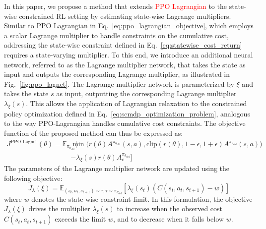 In this paper, we propose a method that extends \textcolor{red}{PPO Lagrangian} to the state-wise constrained RL setting by estimating state-wise Lagrange multipliers.
Similar to PPO Lagrangian in Eq.~\ref{eq:ppo_lagrangian_objective}, which employs a scalar Lagrange multiplier to handle constraints on the cumulative cost, addressing the state-wise constraint defined in Eq.~\ref{eq:statewise_cost_return} requires a state-varying multiplier.
To this end, we introduce an additional neural network, referred to as the Lagrange multiplier network, that takes the state as input and outputs the corresponding Lagrange multiplier, as illustrated in Fig.~\ref{fig:ppo_lagnet}.
The Lagrange multiplier network is parameterized by $\xi$ and takes the state $s$ as input, outputting the corresponding Lagrange multiplier $\lambda_\xi(s)$.
This allows the application of Lagrangian relaxation to the constrained policy optimization defined in Eq.~\ref{eq:scmdp_optimization_problem}, analogous to the way PPO-Lagrangian handles cumulative cost constraints.
The objective function of the proposed method can thus be expressed as:
\begin{equation} 
    \begin{aligned} J^{\text{PPO-Lagnet}}(\theta) 
        = \mathbb{E}_{\pi_{\theta_\text{old}}} \Big[ &\min \big( r(\theta) A^{\pi_{\theta_\text{old}}}(s, a), \text{clip}(r(\theta), 1 - \epsilon, 1 + \epsilon) A^{\pi_{\theta_\text{old}}}(s, a) \big) 
        \\ &- \lambda_\xi(s) r(\theta) A^{\pi_{\theta_\text{old}}}_c \Big] 
    \end{aligned} 
\end{equation}
The parameters of the Lagrange multiplier network are updated using the following objective:
\begin{equation} \label{eq:lagrange_multiplier_update}
    J_\lambda(\xi) = \mathbb{E}_{(s_t, a_t, s_{t + 1}) \sim \tau, \tau \sim \pi_{\theta_\text{old}}} [\lambda_\xi(s_t) (C(s_t, a_t, s_{t + 1}) - w)]
\end{equation}
where $w$ denotes the state-wise constraint limit. 
In this formulation, the objective $J_\lambda(\xi)$ drives the multiplier $\lambda_\xi(s)$ to increase when the observed cost $C(s_t, a_t, s_{t+1})$ exceeds the limit $w$, and to decrease when it falls below $w$.
